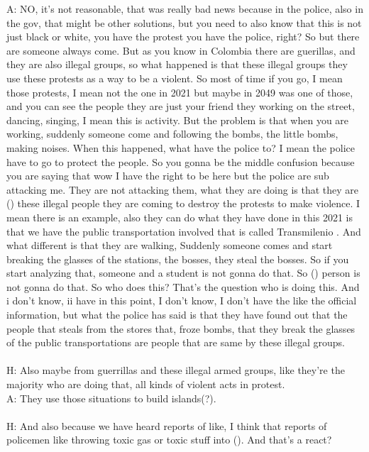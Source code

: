 \documentclass{phyasgn}\usepackage{nag}
\begin{document}
A: NO, it’s not reasonable, that was really bad news because in the police, also in the gov, that might be other solutions, but you need to also know that this is not just black or white, you have the protest you have the police, right? So but there are someone always come. But as you know in Colombia there are guerillas, and they are also illegal groups, so what happened is that these illegal groups they use these protests as a way to be a violent. So most of time if you go, I mean those protests, I mean not the one in 2021 but maybe in 2049 was one of those, and you can see the people they are just your friend they working on the street, dancing, singing, I mean this is activity. But the problem is that when you are working, suddenly someone come and following the bombs, the little bombs, making noises. When this happened, what have the police to? I mean the police have to go to protect the people. So you gonna be the middle confusion because you are saying that wow I have the right to be here but the police are sub attacking me. They are not attacking them, what they are doing is that they are () these illegal people they are coming to destroy the protests to make violence. I mean there is an example, also they can do what they have done in this 2021 is that we have the public transportation involved that is called Transmilenio . And what different is that they are walking, Suddenly someone comes and start breaking the glasses of the stations, the bosses, they steal the bosses. So if you start analyzing that, someone and a student is not gonna do that. So () person is not gonna do that. So who does this? That's the question who is doing this. And i don't know, ii have in this point, I don't know, I don't have the like the official information, but what the police has said is that they have found out that the people that steals from the stores that, froze bombs, that they break the glasses of the public transportations are people that are same by these illegal groups.\\
\\
H: Also maybe from guerrillas and these illegal armed groups, like they're the majority who are doing that, all kinds of violent acts in protest.\\
A: They use those situations to build islands(?).\\
\\
H: And also because we have heard reports of like, I think that reports of policemen like throwing toxic gas or toxic stuff into (). And that's a react?\\
\end{document}
